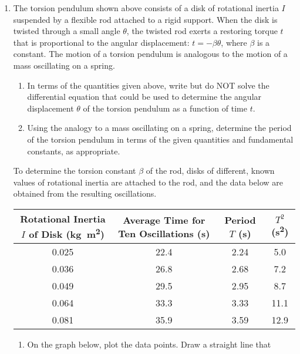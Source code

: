 \documentclass{../../../oss-apphys}
\begin{document}
\begin{enumerate}[leftmargin=15pt]
  \begin{center}
  \end{center}
\item The torsion pendulum shown above consists of a disk of rotational inertia
  $I$ suspended by a flexible rod attached to a rigid support. When the disk is
  twisted through a small angle $\theta$, the twisted rod exerts a restoring
  torque $t$ that is proportional to the angular displacement:
  $t=-\beta\theta$, where $\beta$ is a constant. The motion of a torsion
  pendulum is analogous to the motion of a mass oscillating on a spring.
  \begin{enumerate}[leftmargin=15pt]
  \item In terms of the quantities given above, write but do NOT solve the
    differential equation that could be used to determine the angular
    displacement $\theta$ of the torsion pendulum as a function of time $t$.
    \vspace{1.24in}
  \item Using the analogy to a mass oscillating on a spring, determine the
    period of the torsion pendulum in terms of the given quantities and
    fundamental constants, as appropriate.
    \vspace{1.24in}
  \end{enumerate}
  To determine the torsion constant $\beta$ of the rod, disks of different,
  known values of rotational inertia are attached to the rod, and the data
  below are obtained from the resulting oscillations.
  \begin{center}
    \begin{tabular}{|c|c|c|c|}
      \hline
      Rotational Inertia $I$ of Disk (\si{\kilo\gram\metre^2}) &
      Average Time for Ten Oscillations (s) &
      Period $T$ (s) &
      $T^2$ (\si{\second^2}) \\\hline
      0.025 & 22.4 & 2.24 & 5.0  \\\hline
      0.036 & 26.8 & 2.68 & 7.2  \\\hline
      0.049 & 29.5 & 2.95 & 8.7  \\\hline
      0.064 & 33.3 & 3.33 & 11.1 \\\hline
      0.081 & 35.9 & 3.59 & 12.9 \\\hline
    \end{tabular}
  \end{center}
  \newpage
  \begin{enumerate}[leftmargin=15pt,resume]
  \item On the graph below, plot the data points. Draw a straight line that

\end{enumerate}
\end{enumerate}
\end{document}
